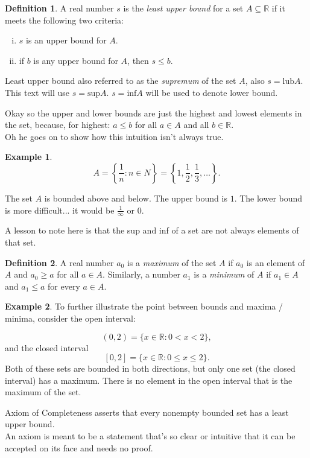 \documentclass{article}
\numberwithin{equation}{subsection}
\theoremstyle{definition}
\newtheorem{definition}{Definition}
\newtheorem{example}{Example}
\begin{document}
\begin{definition}
    A real number $s$ is the \emph{least upper bound} for a set $A \subseteq \mathbb{R}$
    if it meets the following two criteria:

    \begin{enumerate}[(i)]
        \item $s$ is an upper bound for $A$.\\
        \item if $b$ is any upper bound for $A$, then $s \leq b$.
    \end{enumerate}
\end{definition}

Least upper bound also referred to as the \emph{supremum} of the set $A$, also $s =
\text{lub} A$. This text will use $s = \text{sup} A$. $s = \text{inf} A$ will be used to
denote lower bound.

Okay so the upper and lower bounds are just the highest and lowest elements in the set,
because, for highest: $a \leq b$ for all $a \in A$ and all $b \in \mathbb{R}$.\\

Oh he goes on to show how this intuition isn't always true.

\begin{example}
    
    $$
    A = \left\{ \frac{1}{n}: n \in N \right\} = \left\{ 1, \frac{1}{2}, \frac{1}{3}, \ldots \right\}.
    $$

   The set $A$ is bounded above and below. The upper bound is $1$. The lower bound is
    more difficult... it would be $\frac{1}{\infty}$ or $0$.

    A lesson to note here is that the sup and inf of a set are not always elements of that
set.

\end{example}


\begin{definition}
    A real number $a_0$ is a \emph{maximum} of the set $A$ if $a_0$ is an element of $A$
    and $a_0 \geq a$ for all $a \in A$. Similarly, a number $a_1$ is a \emph{minimum} of
    $A$ if $a_1 \in A$ and $a_1 \leq a$ for every $a \in A$.
\end{definition}


\begin{example}
    To further illustrate the point between bounds and maxima / minima, consider the open
    interval:

    $$
    (0, 2) = \{x \in \mathbb{R}: 0 < x < 2\},
    $$
    and the closed interval
    $$
    [0, 2] = \{x \in \mathbb{R}: 0 \leq x \leq 2\}.
    $$
    Both of these sets are bounded in both directions, but only one set (the closed
    interval) has a maximum. There is no element in the open interval that is the maximum
    of the set.

    Axiom of Completeness asserts that every nonempty bounded set has a least upper bound.
    \\

    An axiom is meant to be a statement that's so clear or intuitive that it can be
    accepted on its face and needs no proof.

\end{example}
\end{document}
